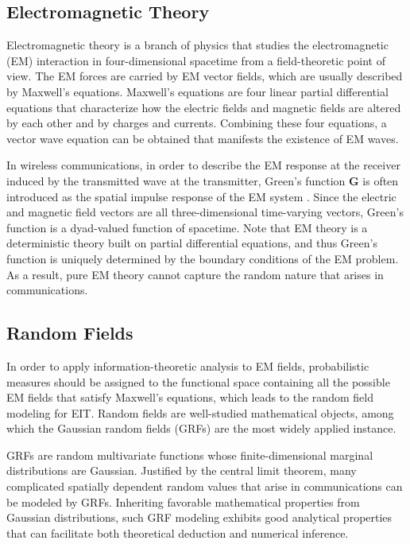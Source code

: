 \documentclass[journal,twocolumn]{IEEEtran}
\begin{document}
\subsection{Electromagnetic Theory}
\label{Sec_2_Subsec_3}
Electromagnetic theory is a branch of physics that studies the electromagnetic (EM) interaction in four-dimensional spacetime from a field-theoretic point of view. The EM forces are carried by EM vector fields, which are usually described by Maxwell's equations. Maxwell's equations are four linear partial differential equations that characterize how the electric fields and magnetic fields are altered by each other and by charges and currents. Combining these four equations, a vector wave equation can be obtained that manifests the existence of EM waves. 

In wireless communications, in order to describe the EM response at the receiver induced by the transmitted wave at the transmitter, Green's function $\bm G$ is often introduced as the spatial impulse response of the EM system \cite{stratton2007electromagnetic}. Since the electric and magnetic field vectors are all three-dimensional time-varying vectors, Green's function is a dyad-valued function of spacetime. 
Note that EM theory is a deterministic theory built on partial differential equations, and thus Green's function is uniquely determined by the boundary conditions of the EM problem.
As a result, pure EM theory cannot capture the random nature that arises in communications. 

\subsection{Random Fields}
\label{Sec_2_Subsec_4}
In order to apply information-theoretic analysis to EM fields, probabilistic measures should be assigned to the functional space containing all the possible EM fields that satisfy Maxwell's equations, which leads to the random field modeling for EIT. 
Random fields are well-studied mathematical objects, among which the Gaussian random fields (GRFs) are the most widely applied instance. 

GRFs are random multivariate functions whose finite-dimensional marginal distributions are Gaussian. Justified by the central limit theorem, many complicated spatially dependent random values that arise in communications can be modeled by GRFs.  
Inheriting favorable mathematical properties from Gaussian distributions, such GRF modeling exhibits good analytical properties that can facilitate both theoretical deduction and numerical inference. 
\end{document}
